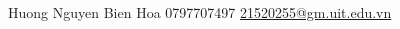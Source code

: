\documentclass[lighthipster]{simplehipstercv}
\newlength{\rightcolwidth}
\begin{document}
\begin{paracol}{2}
\vfill{} %

\setlength{\parindent}{0pt}
\begin{minipage}[t]{\rightcolwidth}
\begin{center}\fontfamily{\sfdefault}\selectfont \color{black!70}
{\small Huong Nguyen   Bien Hoa  0797707497 \newline{} \protect\url{21520255@gm.uit.edu.vn}
}
\end{center}
\end{minipage}

\end{paracol}
\end{document}
